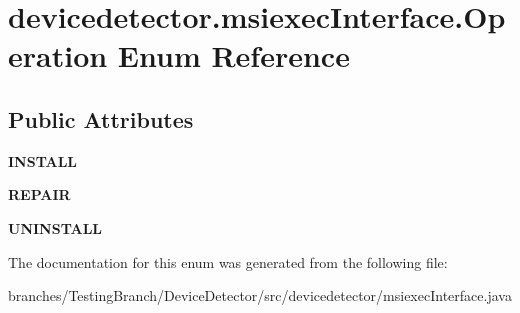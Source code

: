 \hypertarget{enumdevicedetector_1_1msiexecInterface_1_1Operation}{\section{devicedetector.\-msiexec\-Interface.\-Operation Enum Reference}
\label{enumdevicedetector_1_1msiexecInterface_1_1Operation}
}
\subsection*{Public Attributes}
\begin{DoxyCompactItemize}
\item 
\hypertarget{enumdevicedetector_1_1msiexecInterface_1_1Operation_af779693a31ca83040f50caf3c493c6ab}{{\bfseries I\-N\-S\-T\-A\-L\-L}}\label{enumdevicedetector_1_1msiexecInterface_1_1Operation_af779693a31ca83040f50caf3c493c6ab}

\item 
\hypertarget{enumdevicedetector_1_1msiexecInterface_1_1Operation_a56b8216ad7aed635ef00c62d7d4a29d3}{{\bfseries R\-E\-P\-A\-I\-R}}\label{enumdevicedetector_1_1msiexecInterface_1_1Operation_a56b8216ad7aed635ef00c62d7d4a29d3}

\item 
\hypertarget{enumdevicedetector_1_1msiexecInterface_1_1Operation_a2411632c1e472c33d6ee8a6b6e5863df}{{\bfseries U\-N\-I\-N\-S\-T\-A\-L\-L}}\label{enumdevicedetector_1_1msiexecInterface_1_1Operation_a2411632c1e472c33d6ee8a6b6e5863df}

\end{DoxyCompactItemize}


The documentation for this enum was generated from the following file\-:\begin{DoxyCompactItemize}
\item 
branches/\-Testing\-Branch/\-Device\-Detector/src/devicedetector/msiexec\-Interface.\-java\end{DoxyCompactItemize}
